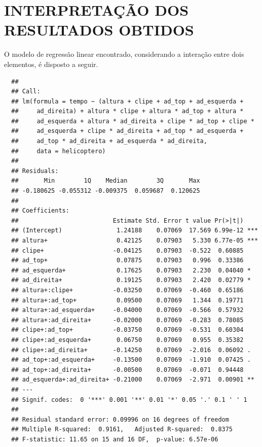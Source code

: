 \chapter{INTERPRETAÇÃO DOS RESULTADOS OBTIDOS}
O modelo de regressão linear encontrado, considerando a interação entre dois elementos, é disposto a seguir.

\begin{knitrout}
  \color{fgcolor}\begin{kframe}
  \begin{verbatim}
  ## 
  ## Call:
  ## lm(formula = tempo ~ (altura + clipe + ad_top + ad_esquerda + 
  ##     ad_direita) + altura * clipe + altura * ad_top + altura * 
  ##     ad_esquerda + altura * ad_direita + clipe * ad_top + clipe * 
  ##     ad_esquerda + clipe * ad_direita + ad_top * ad_esquerda + 
  ##     ad_top * ad_direita + ad_esquerda * ad_direita,
  ##     data = helicoptero)
  ## 
  ## Residuals:
  ##       Min        1Q    Median        3Q       Max 
  ## -0.180625 -0.055312 -0.009375  0.059687  0.120625 
  ## 
  ## Coefficients:
  ##                          Estimate Std. Error t value Pr(>|t|)    
  ## (Intercept)               1.24188    0.07069  17.569 6.99e-12 ***
  ## altura+                   0.42125    0.07903   5.330 6.77e-05 ***
  ## clipe+                   -0.04125    0.07903  -0.522  0.60885    
  ## ad_top+                   0.07875    0.07903   0.996  0.33386    
  ## ad_esquerda+              0.17625    0.07903   2.230  0.04040 *  
  ## ad_direita+               0.19125    0.07903   2.420  0.02779 *  
  ## altura+:clipe+           -0.03250    0.07069  -0.460  0.65186    
  ## altura+:ad_top+           0.09500    0.07069   1.344  0.19771    
  ## altura+:ad_esquerda+     -0.04000    0.07069  -0.566  0.57932    
  ## altura+:ad_direita+      -0.02000    0.07069  -0.283  0.78085    
  ## clipe+:ad_top+           -0.03750    0.07069  -0.531  0.60304    
  ## clipe+:ad_esquerda+       0.06750    0.07069   0.955  0.35382    
  ## clipe+:ad_direita+       -0.14250    0.07069  -2.016  0.06092 .  
  ## ad_top+:ad_esquerda+     -0.13500    0.07069  -1.910  0.07425 .  
  ## ad_top+:ad_direita+      -0.00500    0.07069  -0.071  0.94448    
  ## ad_esquerda+:ad_direita+ -0.21000    0.07069  -2.971  0.00901 ** 
  ## ---
  ## Signif. codes:  0 '***' 0.001 '**' 0.01 '*' 0.05 '.' 0.1 ' ' 1
  ## 
  ## Residual standard error: 0.09996 on 16 degrees of freedom
  ## Multiple R-squared:  0.9161,	Adjusted R-squared:  0.8375 
  ## F-statistic: 11.65 on 15 and 16 DF,  p-value: 6.57e-06
  \end{verbatim}
  \end{kframe}
  \end{knitrout}

